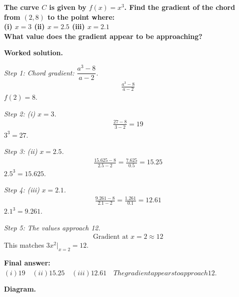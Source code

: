 \documentclass[11pt]{article}
\newcommand{\question}[1]{\par\medskip\noindent\textbf{#1}\par}
\begin{document}
\question{The curve \( C \) is given by \( f(x) = x^3 \). Find the gradient of the chord from \( (2, 8) \) to the point where:\\[3pt]  (i) \( x = 3 \) \quad  (ii) \( x = 2.5 \) \quad  (iii) \( x = 2.1 \)\\[3pt]  What value does the gradient appear to be approaching?}

\textbf{Worked solution.}

\textit{Step 1: Chord gradient: \( \dfrac{a^3 - 8}{a - 2} \).}
\[\begin{gathered}
\frac{a^3 - 8}{a - 2}
\end{gathered}\]
\( f(2) = 8 \).

\textit{Step 2: (i) \( x = 3 \).}
\[\begin{gathered}
\frac{27 - 8}{3 - 2} = 19
\end{gathered}\]
\( 3^3 = 27 \).

\textit{Step 3: (ii) \( x = 2.5 \).}
\[\begin{gathered}
\frac{15.625 - 8}{2.5 - 2} = \frac{7.625}{0.5} = 15.25
\end{gathered}\]
\( 2.5^3 = 15.625 \).

\textit{Step 4: (iii) \( x = 2.1 \).}
\[\begin{gathered}
\frac{9.261 - 8}{2.1 - 2} = \frac{1.261}{0.1} = 12.61
\end{gathered}\]
\( 2.1^3 = 9.261 \).

\textit{Step 5: The values approach 12.}
\[\begin{gathered}
\text{Gradient at } x = 2 \approx 12
\end{gathered}\]
This matches \( 3x^2 \big|_{x=2} = 12 \).

\begin{answerbox}
\textbf{Final answer:}\quad \(\displaystyle (i) 19 \quad (ii) 15.25 \quad (iii) 12.61 \quad The gradient appears to approach 12.\)
\end{answerbox}
\textbf{Diagram.}
\end{document}
